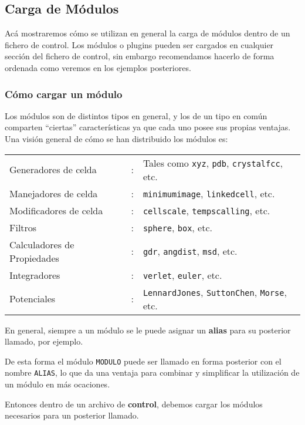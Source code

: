 \subsection{Carga de M\'odulos}

Ac\'a mostraremos c\'omo se utilizan en general la carga de m\'odulos dentro de
un fichero de control. Los m\'odulos o plugins pueden ser cargados en cualquier
secci\'on del fichero de control, sin embargo recomendamos hacerlo de forma
ordenada como veremos en los ejemplos posteriores.

\subsubsection{C\'omo cargar un m\'odulo}

Los m\'odulos son de distintos tipos en general, y los de un tipo en com\'un
comparten ``ciertas'' caracter\'isticas ya que cada uno posee sus propias
ventajas. Una visi\'on general de c\'omo se han distribuido los m\'odulos es: 

\begin{tabular}{lcl}
 Generadores de celda & : & Tales como \verb|xyz|, \verb|pdb|, \verb|crystalfcc|, etc. \\
 Manejadores de celda & : &\verb|minimumimage|, \verb|linkedcell|, etc. \\
 Modificadores de celda & : &\verb|cellscale|, \verb|tempscalling|, etc.\\
 Filtros & : &\verb|sphere|, \verb|box|, etc.\\
 Calculadores de Propiedades & : & \verb|gdr|, \verb|angdist|, \verb|msd|, etc. \\
 Integradores & : & \verb|verlet|, \verb|euler|, etc. \\
 Potenciales & : & \verb|LennardJones|, \verb|SuttonChen|, \verb|Morse|, etc. \\
\end{tabular}

En general, siempre a un m\'odulo se le puede asignar un \textbf{alias} para su
posterior llamado, por ejemplo.


De esta forma el m\'odulo \texttt{MODULO} puede ser llamado en forma posterior
con el nombre \texttt{ALIAS}, lo que da una ventaja para combinar y simplificar
la utilizaci\'on de un m\'odulo en m\'as ocaciones.

Entonces dentro de un archivo de \textbf{control}, debemos cargar los m\'odulos
necesarios para un posterior llamado.

